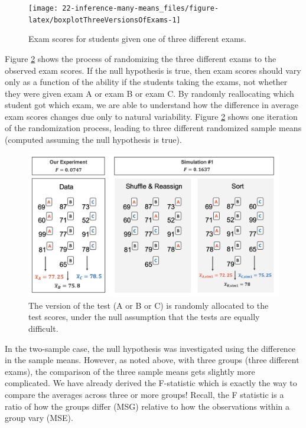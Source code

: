 \documentclass[
  10pt,
  openany]{book}
\begin{document}
\begin{figure}[h]

{\centering \texttt{[image: 22-inference-many-means\_files/figure-latex/boxplotThreeVersionsOfExams-1]} 

}

\caption{Exam scores for students given one of three different exams.}\label{fig:boxplotThreeVersionsOfExams}
\end{figure}

Figure \ref{fig:randANOVA} shows the process of randomizing the three different exams to the observed exam scores.
If the null hypothesis is true, then exam scores should vary only as a function of the ability if the students taking the exams, not whether they were given exam A or exam B or exam C.
By randomly reallocating which student got which exam, we are able to understand how the difference in average exam scores changes due only to natural variability.
Figure \ref{fig:randANOVA} shows one iteration of the randomization process, leading to three different randomized sample means (computed assuming the null hypothesis is true).

\begin{figure}[h]

{\centering \includegraphics[width=0.75\linewidth]{images/randANOVA} 

}

\caption{The version of the test (A or B or C) is randomly allocated to the test scores, under the null assumption that the tests are equally difficult.}\label{fig:randANOVA}
\end{figure}

In the two-sample case, the null hypothesis was investigated using the difference in the sample means.
However, as noted above, with three groups (three different exams), the comparison of the three sample means gets slightly more complicated.
We have already derived the F-statistic which is exactly the way to compare the averages across three or more groups!
Recall, the F statistic is a ratio of how the groups differ (MSG) relative to how the observations within a group vary (MSE).
\end{document}
